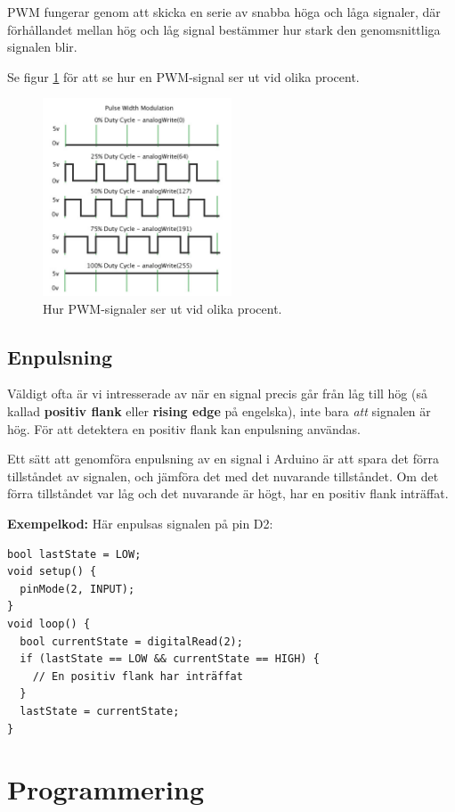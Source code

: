 \documentclass[11pt]{article}
\begin{document}
PWM fungerar genom att skicka en serie av snabba höga och låga signaler, där
förhållandet mellan hög och låg signal bestämmer hur stark den genomsnittliga
signalen blir.

Se figur \ref{fig:pwm} för att se hur en PWM-signal ser ut vid olika procent.
\begin{figure}[H]
  \centering
  \includegraphics[width=0.5\textwidth]{pwm}
  \caption{Hur PWM-signaler ser ut vid olika procent.}
  \label{fig:pwm}
\end{figure}

\subsection{Enpulsning}\label{sec:enpulsning}
Väldigt ofta är vi intresserade av när en signal precis går från låg till hög
(så kallad \textbf{positiv flank} eller \textbf{rising edge} på engelska), inte
bara \textit{att} signalen är hög. För att detektera en positiv flank kan
enpulsning användas.

Ett sätt att genomföra enpulsning av en signal i Arduino är att spara det förra
tillståndet av signalen, och jämföra det med det nuvarande tillståndet. Om det
förra tillståndet var låg och det nuvarande är högt, har en positiv flank
inträffat.

\textbf{Exempelkod:}
Här enpulsas signalen på pin D2:
\begin{lstlisting}
bool lastState = LOW;
void setup() {
  pinMode(2, INPUT);
}
void loop() {
  bool currentState = digitalRead(2);
  if (lastState == LOW && currentState == HIGH) {
    // En positiv flank har inträffat
  }
  lastState = currentState;
}
\end{lstlisting}

\newpage
\section{Programmering}
\end{document}
